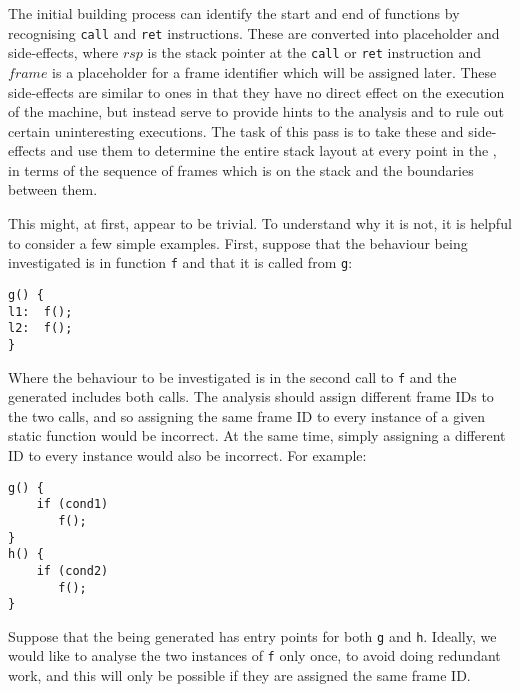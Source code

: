 
The initial \StateMachine building process can identify the start and
end of functions by recognising \verb|call| and \verb|ret|
instructions.  These are converted into placeholder
 and  side-effects, where $rsp$ is the stack pointer at the
\verb|call| or \verb|ret| instruction and $frame$ is a placeholder for
a frame identifier which will be assigned later.  These side-effects
are similar to  ones in that they have no direct effect
on the execution of the machine, but instead serve to provide hints to
the analysis and to rule out certain uninteresting executions.  The
task of this pass is to take these  and
 side-effects and use them to determine the entire
stack layout at every point in the \StateMachine, in terms of the
sequence of frames which is on the stack and the boundaries between
them.

This might, at first, appear to be trivial.  To understand why it is
not, it is helpful to consider a few simple examples.  First, suppose
that the behaviour being investigated is in function \verb|f| and that
it is called from \verb|g|:

\begin{verbatim}
g() {
l1:  f();
l2:  f();
}
\end{verbatim}

Where the behaviour to be investigated is in the second call to
\verb|f| and the {\StateMachine} generated includes both calls.  The
analysis should assign different frame IDs to the two calls, and so
assigning the same frame ID to every instance of a given static
function would be incorrect.  At the same time, simply assigning a
different ID to every instance would also be incorrect.  For example:

\begin{verbatim}
g() {
    if (cond1)
       f();
}
h() {
    if (cond2)
       f();
}
\end{verbatim}

Suppose that the \StateMachine being generated has entry points for
both \verb|g| and \verb|h|.  Ideally, we would like to analyse the two
instances of \verb|f| only once, to avoid doing redundant work, and
this will only be possible if they are assigned the same frame ID.

